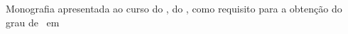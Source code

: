 \begin{flushright}
    \begin{minipage}{0.5\textwidth}
    Monografia apresentada ao curso \nomedocurso \hspace{1mm}do \dep, do \instituto, como requisito para a obtenção do grau de \titulacao \ em \nomedocurso
    \end{minipage}
    
    \vspace*{0.2in}
    
    \begin{minipage}{0.5\textwidth}
       \begin{minipage}[t]{0.35\textwidth}
        \genorientador
       \end{minipage}
       \begin{minipage}[t]{0.6\textwidth}
        \orientador
       \end{minipage}\\
       
       \begin{minipage}[t]{0.35\textwidth}
        \coorientador
       \end{minipage}
       \begin{minipage}[t]{0.6\textwidth}
        \nomecoorientador
       \end{minipage}
    \end{minipage}

\end{flushright}
\vspace*{.5in}

\begin{center}
    \Month \\ \the\year
\end{center}